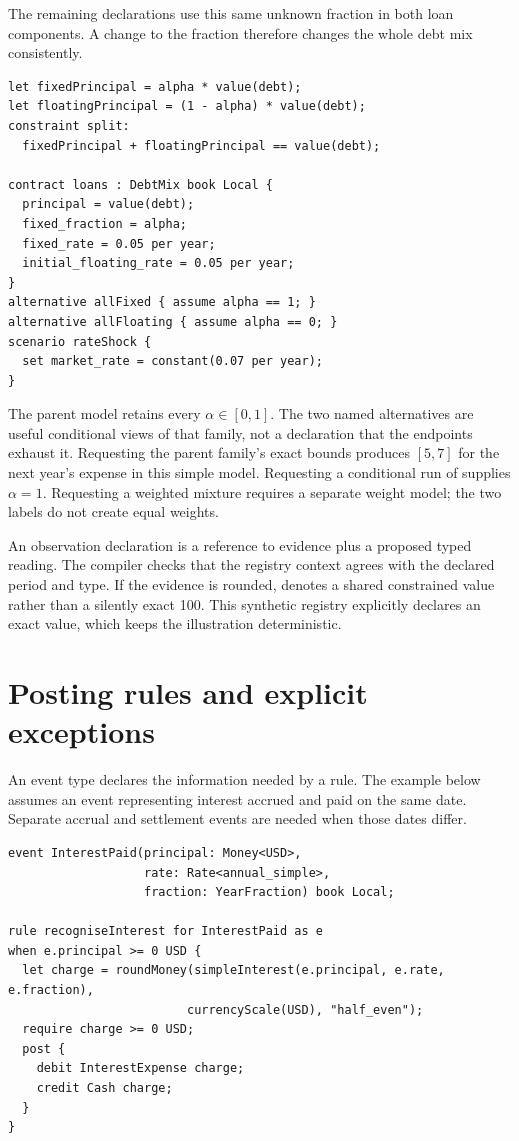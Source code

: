 The remaining declarations use this same unknown fraction in both loan
components. A change to the fraction therefore changes the whole debt mix
consistently.

\begin{lstlisting}
let fixedPrincipal = alpha * value(debt);
let floatingPrincipal = (1 - alpha) * value(debt);
constraint split:
  fixedPrincipal + floatingPrincipal == value(debt);

contract loans : DebtMix book Local {
  principal = value(debt);
  fixed_fraction = alpha;
  fixed_rate = 0.05 per year;
  initial_floating_rate = 0.05 per year;
}
alternative allFixed { assume alpha == 1; }
alternative allFloating { assume alpha == 0; }
scenario rateShock {
  set market_rate = constant(0.07 per year);
}
\end{lstlisting}

The parent model retains every $\alpha\in[0,1]$. The two named alternatives
are useful conditional views of that family, not a declaration that the
endpoints exhaust it. Requesting the parent family's exact bounds produces
$[5,7]$ for the next year's expense in this simple model. Requesting a
conditional run of  supplies $\alpha=1$. Requesting a weighted
mixture requires a separate weight model; the two labels do not create equal
weights.

An observation declaration is a reference to evidence plus a proposed typed
reading. The compiler checks that the registry context agrees with the declared
period and type. If the evidence is rounded,  denotes a
shared constrained value rather than a silently exact 100. This synthetic
registry explicitly declares an exact value, which keeps the illustration
deterministic.

\begin{minipage}{\linewidth}
\section{Posting rules and explicit exceptions}

An event type declares the information needed by a rule. The example below
assumes an event representing interest accrued and paid on the same date.
Separate accrual and settlement events are needed when those dates differ.

\begin{lstlisting}
event InterestPaid(principal: Money<USD>,
                   rate: Rate<annual_simple>,
                   fraction: YearFraction) book Local;

rule recogniseInterest for InterestPaid as e
when e.principal >= 0 USD {
  let charge = roundMoney(simpleInterest(e.principal, e.rate, e.fraction),
                         currencyScale(USD), "half_even");
  require charge >= 0 USD;
  post {
    debit InterestExpense charge;
    credit Cash charge;
  }
}
\end{lstlisting}
\end{minipage}

